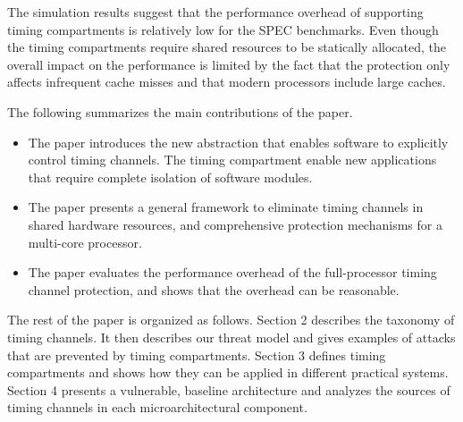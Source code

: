 The simulation results suggest that the performance overhead of supporting
timing compartments is relatively low for the SPEC benchmarks. Even though
the timing compartments require shared resources to be statically 
allocated, the overall impact on the performance is limited by the fact
that the protection only affects infrequent cache misses and that modern
processors include large caches. 

The following summarizes the main contributions of the paper.

\begin{itemize}
\item The paper introduces the new abstraction that enables software to
explicitly control timing channels. The timing compartment enable new
applications that require complete isolation of software modules.
\item The paper presents a general framework to eliminate timing channels
in shared hardware resources, and comprehensive protection mechanisms for
a multi-core processor.
\item The paper evaluates the performance overhead of the full-processor
timing channel protection, and shows that the overhead can be reasonable.
\end{itemize}

The rest of the paper is organized as follows.
Section 2 describes the taxonomy of timing channels. It then describes our 
threat model and gives examples of attacks that are prevented by timing 
compartments. Section 3 defines timing compartments and shows how they can be 
applied in different practical systems. Section 4 presents a vulnerable, 
baseline architecture and analyzes the sources of timing channels in each 
microarchitectural component.
